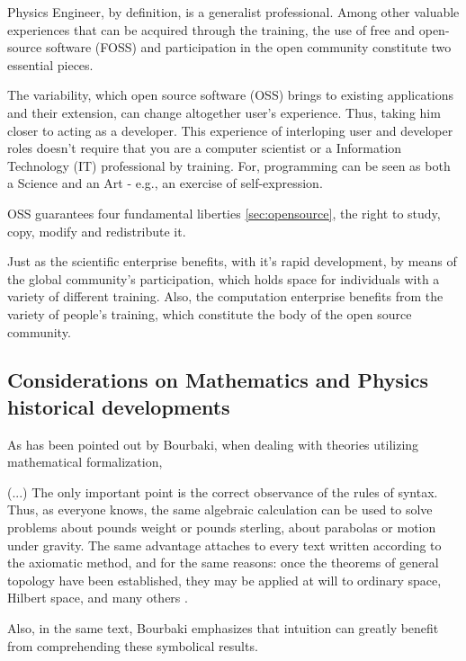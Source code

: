\documentclass[
12pt,				%
openright,			%
oneside,			%
a4paper,			%
brazil,				%
english,			%
]{abntex2}
\begin{document}
Physics Engineer, by definition, is a generalist professional.
Among other valuable experiences that can be acquired through the
training, the use of free and open-source software (FOSS) and
participation in the open community constitute two essential pieces.

The variability, which open source software (OSS) brings to existing
applications and their extension, can change altogether user's
experience. Thus, taking him closer to acting as a developer. This
experience of interloping user and developer roles doesn't require
that you are a computer scientist or a Information Technology (IT)
professional by training. For, programming can be seen as both a
Science and an Art \cite{knuth1968art} - e.g., an exercise of
self-expression.

OSS guarantees four fundamental liberties \autoref{sec:opensource}, the right to study, copy, modify and redistribute it.

Just as the scientific enterprise benefits, with it's rapid development, by means of the global community's participation, which holds space for individuals with a variety of different training. Also, the computation enterprise benefits from the variety of people's training, which constitute the body of the open source community.

\subsection{Considerations on Mathematics and Physics historical developments}

As has been pointed out by Bourbaki, when dealing with theories
utilizing mathematical formalization,

\begin{citacao}
  (...) The only important point is the correct observance of the rules
  of syntax. Thus, as everyone knows, the same algebraic calculation can
  be used to solve problems about pounds  weight or pounds sterling,
  about parabolas or motion under gravity. The same advantage attaches
  to every text written according to the axiomatic method, and for the
  same reasons: once the theorems of general topology have been
  established, they may be applied at will to ordinary space, Hilbert
  space, and many others \cite{bourbaki2004theory}.
\end{citacao}

Also, in the same text, Bourbaki emphasizes that intuition can greatly
benefit from comprehending these symbolical results.  
\end{document}
